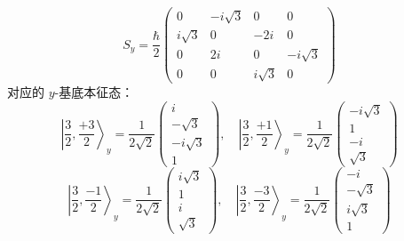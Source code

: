 \[
S_y = \frac{\hbar}{2}
\begin{pmatrix}
0 & -i\sqrt{3} & 0 & 0 \\
i\sqrt{3} & 0 & -2i & 0 \\
0 & 2i & 0 & -i\sqrt{3} \\
0 & 0 & i\sqrt{3} & 0
\end{pmatrix}~
\]
对应的 \( y \)-基底本征态：
\[
\left| \frac{3}{2}, \frac{+3}{2} \right\rangle_y = \frac{1}{2\sqrt{2}}
\begin{pmatrix}
i \\
-\sqrt{3} \\
- i\sqrt{3} \\
1
\end{pmatrix},
\quad
\left| \frac{3}{2}, \frac{+1}{2} \right\rangle_y = \frac{1}{2\sqrt{2}}
\begin{pmatrix}
- i\sqrt{3} \\
1 \\
- i \\
\sqrt{3}
\end{pmatrix}~
\]
\[
\left| \frac{3}{2}, \frac{-1}{2} \right\rangle_y = \frac{1}{2\sqrt{2}}
\begin{pmatrix}
i\sqrt{3} \\
1 \\
i \\
\sqrt{3}
\end{pmatrix},
\quad
\left| \frac{3}{2}, \frac{-3}{2} \right\rangle_y = \frac{1}{2\sqrt{2}}
\begin{pmatrix}
- i \\
-\sqrt{3} \\
i\sqrt{3} \\
1
\end{pmatrix}~
\]


